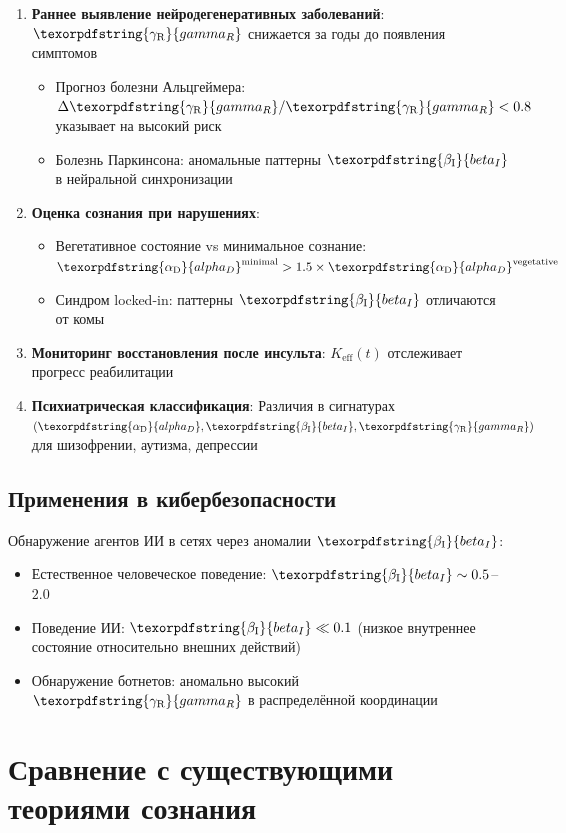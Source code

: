 \documentclass[12pt,a4paper]{article}
\DeclareRobustCommand{\alD}{\texorpdfstring{\ensuremath{\alpha_{\mathrm{D}}}}{alpha_D}}
\DeclareRobustCommand{\beI}{\texorpdfstring{\ensuremath{\beta_{\mathrm{I}}}}{beta_I}}
\DeclareRobustCommand{\gaR}{\texorpdfstring{\ensuremath{\gamma_{\mathrm{R}}}}{gamma_R}}
\newcommand{\eff}{\mathrm{eff}}
\newcommand{\Ke}{K_{\eff}}
\begin{document}
	\begin{enumerate}
		\item \textbf{Раннее выявление нейродегенеративных заболеваний}: \(\gaR\) снижается за годы до появления симптомов
		\begin{itemize}
			\item Прогноз болезни Альцгеймера: \(\Delta\gaR/\gaR < 0.8\) указывает на высокий риск
			\item Болезнь Паркинсона: аномальные паттерны \(\beI\) в нейральной синхронизации
		\end{itemize}
		
		\item \textbf{Оценка сознания при нарушениях}:
		\begin{itemize}
			\item Вегетативное состояние vs минимальное сознание: \(\alD^{\mathrm{minimal}} > 1.5 \times \alD^{\mathrm{vegetative}}\)
			\item Синдром locked-in: паттерны \(\beI\) отличаются от комы
		\end{itemize}
		
		\item \textbf{Мониторинг восстановления после инсульта}: \(\Ke(t)\) отслеживает прогресс реабилитации
		\item \textbf{Психиатрическая классификация}: Различия в сигнатурах \((\alD, \beI, \gaR)\) для шизофрении, аутизма, депрессии
	\end{enumerate}
	
	\subsection{Применения в кибербезопасности}
	
	Обнаружение агентов ИИ в сетях через аномалии \(\beI\):
	\begin{itemize}
		\item Естественное человеческое поведение: \(\beI \sim 0.5\)--\(2.0\)
		\item Поведение ИИ: \(\beI \ll 0.1\) (низкое внутреннее состояние относительно внешних действий)
		\item Обнаружение ботнетов: аномально высокий \(\gaR\) в распределённой координации
	\end{itemize}
	
	\section{Сравнение с существующими теориями сознания}
	
\end{document}
